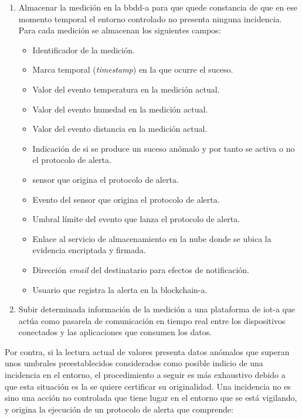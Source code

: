 \documentclass[12pt,a4paper, twoside]{report}
\begin{document}
	\begin{enumerate}
		\item Almacenar la medición en la \gls{bbdd-a} para que quede constancia de que en ese momento temporal el entorno controlado no presenta ninguna incidencia. Para cada medición se almacenan los siguientes campos:
		
			\begin{itemize}
				\item Identificador de la medición.
				\item Marca temporal (\textit{timestamp}) en la que ocurre el suceso.
				\item Valor del evento temperatura en la medición actual.
				\item Valor del evento humedad en la medición actual.
				\item Valor del evento distancia en la medición actual.
				\item Indicación de si se produce un suceso anómalo y por tanto se activa o no el protocolo de alerta.
				\item \Gls{sensor} que origina el protocolo de alerta.
				\item Evento del \gls{sensor} que origina el protocolo de alerta.
				\item Umbral límite del evento que lanza el protocolo de alerta.
				\item Enlace al servicio de almacenamiento en la nube donde se ubica la evidencia encriptada y firmada.
				\item Dirección \textit{email} del destinatario para efectos de notificación.
				\item Usuario que registra la alerta en la \gls{blockchain-a}.
			\end{itemize}
				
		\item Subir determinada información de la medición a una plataforma de \gls{iot-a} que actúa como pasarela de comunicación en tiempo real entre los dispositivos conectados y las aplicaciones que consumen los datos.	%
	\end{enumerate}
		
	Por contra, si la lectura actual de valores presenta datos anómalos que superan unos umbrales preestablecidos considerados como posible indicio de una incidencia en el entorno, el procedimiento a seguir es más exhaustivo debido a que esta situación es la se quiere certificar su originalidad. Una incidencia no es sino una acción no controlada que tiene lugar en el entorno que se está vigilando, y origina la ejecución de un protocolo de alerta que comprende:
		
\end{document}
